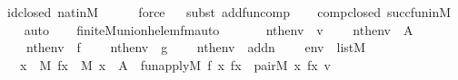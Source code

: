 \begin{isabellebody}
\ id{\isacharunderscore}{\kern0pt}closed\ nat{\isacharunderscore}{\kern0pt}in{\isacharunderscore}{\kern0pt}M\ \isanewline
\ \ \ \isamarkupfalse%
\ force\isanewline
\ \ \isamarkupfalse%
{\isacharparenleft}{\kern0pt}subst\ add{\isacharunderscore}{\kern0pt}fun{\isacharunderscore}{\kern0pt}comp{\isacharparenright}{\kern0pt}\isanewline
\ \ \isamarkupfalse%
\ comp{\isacharunderscore}{\kern0pt}closed\ succ{\isacharunderscore}{\kern0pt}fun{\isacharunderscore}{\kern0pt}in{\isacharunderscore}{\kern0pt}M\ \isanewline
\ \ \isamarkupfalse%
\ auto%
\endisatagproof
{\isafoldproof}%
%
\isadelimproof
\isanewline
%
\endisadelimproof
\ \ \isanewline
{}\isamarkupfalse%
\ finite{\isacharunderscore}{\kern0pt}M{\isacharunderscore}{\kern0pt}union{\isacharunderscore}{\kern0pt}h{\isacharunderscore}{\kern0pt}elem{\isacharunderscore}{\kern0pt}fm{\isacharunderscore}{\kern0pt}auto{\isacharcolon}{\kern0pt}\isanewline
\ \ \isanewline
\ \ \ \ {\isachardoublequoteopen}nth{\isacharparenleft}{\kern0pt}{}{\isacharcomma}{\kern0pt}env{\isacharparenright}{\kern0pt}\ {\isacharequal}{\kern0pt}\ v{\isachardoublequoteclose}\isanewline
\ \ \ \ {\isachardoublequoteopen}nth{\isacharparenleft}{\kern0pt}{}{\isacharcomma}{\kern0pt}env{\isacharparenright}{\kern0pt}\ {\isacharequal}{\kern0pt}\ A{\isachardoublequoteclose}\isanewline
\ \ \ \ {\isachardoublequoteopen}nth{\isacharparenleft}{\kern0pt}{}{\isacharcomma}{\kern0pt}env{\isacharparenright}{\kern0pt}\ {\isacharequal}{\kern0pt}\ f{\isachardoublequoteclose}\isanewline
\ \ \ \ {\isachardoublequoteopen}nth{\isacharparenleft}{\kern0pt}{}{\isacharcomma}{\kern0pt}env{\isacharparenright}{\kern0pt}\ {\isacharequal}{\kern0pt}\ g{\isachardoublequoteclose}\isanewline
\ \ \ \ {\isachardoublequoteopen}nth{\isacharparenleft}{\kern0pt}{}{\isacharcomma}{\kern0pt}env{\isacharparenright}{\kern0pt}\ {\isacharequal}{\kern0pt}\ addn{\isachardoublequoteclose}\isanewline
\ \ \ \ {\isachardoublequoteopen}env\ {\isasymin}\ list{\isacharparenleft}{\kern0pt}M{\isacharparenright}{\kern0pt}{\isachardoublequoteclose}\ \isanewline
\ \ \ {\isachardoublequoteopen}{\isacharparenleft}{\kern0pt}{\isacharparenleft}{\kern0pt}{\isasymexists}x\ {\isasymin}\ M{\isachardot}{\kern0pt}\ {\isasymexists}fx\ {\isasymin}\ M{\isachardot}{\kern0pt}\ x\ {\isasymin}\ A\ {\isasymand}\ fun{\isacharunderscore}{\kern0pt}apply{\isacharparenleft}{\kern0pt}{\isacharhash}{\kern0pt}{\isacharhash}{\kern0pt}M{\isacharcomma}{\kern0pt}\ f{\isacharcomma}{\kern0pt}\ x{\isacharcomma}{\kern0pt}\ fx{\isacharparenright}{\kern0pt}\ {\isasymand}\ pair{\isacharparenleft}{\kern0pt}{\isacharhash}{\kern0pt}{\isacharhash}{\kern0pt}M{\isacharcomma}{\kern0pt}\ x{\isacharcomma}{\kern0pt}\ fx{\isacharcomma}{\kern0pt}\ v{\isacharparenright}{\kern0pt}{\isacharparenright}{\kern0pt}\ {\isasymor}\ \isanewline

\end{isabellebody}
